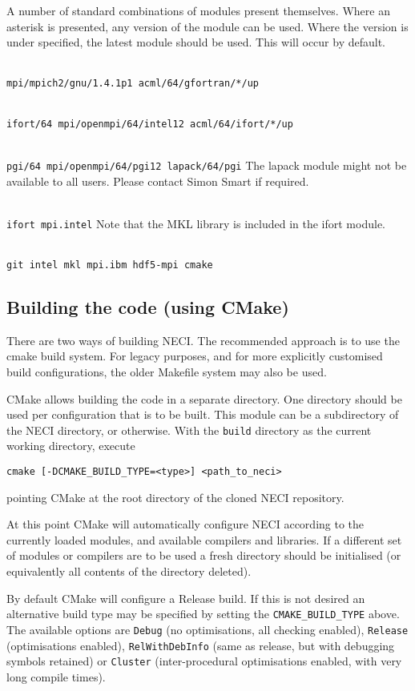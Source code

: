 \documentclass[a4paper,notitlepage]{scrreprt}
\newcommand\headitem[1]{\needspace{1.5\baselineskip}\item[{\boldmath #1 \nopagebreak}] \hfill \\ \nopagebreak}
\let\code\lstinline
\begin{document}
	A number of standard combinations of modules present themselves. Where an
	asterisk is presented, any version of the module can be used. Where the
	version is under specified, the latest module should be used. This will
	occur by default.
	\begin{description}
		\headitem{gfortran (Cambridge)}
			\code{mpi/mpich2/gnu/1.4.1p1 acml/64/gfortran/*/up}
		\headitem{ifort (Cambridge)}
			\code{ifort/64 mpi/openmpi/64/intel12 acml/64/ifort/*/up}
		\headitem{PGI (Cambridge)}
			\code{pgi/64 mpi/openmpi/64/pgi12 lapack/64/pgi} \linebreak
			The lapack module might not be available to all users. Please
			contact Simon Smart if required.
		\headitem{ifort (Max Planck FKF)}
			\code{ifort mpi.intel}\linebreak
			Note that the MKL library is included in the ifort module.
		\headitem{ifort (hydra)}
			\code{git intel mkl mpi.ibm hdf5-mpi cmake}
	\end{description}

\subsection{Building the code (using CMake)}
	There are two ways of building NECI. The recommended approach is to use
	the cmake build system. For legacy purposes, and for more explicitly
	customised build configurations, the older Makefile system may also
	be used.

	CMake allows building the code in a separate directory. One directory
	should be used per configuration that is to be built. This module can
	be a subdirectory of the NECI directory, or otherwise.
	With the \code{build} directory as the current working directory,
	execute
	\begin{lstlisting}[gobble=4]
	cmake [-DCMAKE_BUILD_TYPE=<type>] <path_to_neci>
	\end{lstlisting}
	pointing CMake at the root directory of the cloned NECI repository.

	At this point CMake will automatically configure NECI according to the
	currently loaded modules, and available compilers and libraries. If a
	different set of modules or compilers are to be used a fresh directory
	should be initialised (or equivalently all contents of the directory
	deleted).

	By default CMake will configure a Release build. If this is not desired
	an alternative build type may be specified by setting the
	\code{CMAKE_BUILD_TYPE} above. The available options are \code{Debug} (no
	optimisations, all checking enabled), \code{Release} (optimisations
	enabled), \code{RelWithDebInfo} (same as release, but with debugging
	symbols retained) or \code{Cluster} (inter-procedural optimisations
	enabled, with very long compile times).
\end{document}
